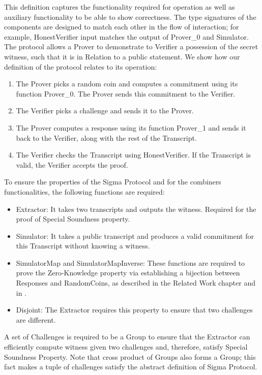 This definition captures the functionality required for operation as well as auxiliary functionality to be able to show correctness. 
The type signatures of the components are designed to match each other in the flow of interaction; for example, HonestVerifier input matches the output of Prover\_0 and Simulator.
The protocol allows a Prover to demonstrate to Verifier a possession of the secret witness, such that it is in Relation to a public statement. 
We show how our definition of the protocol relates to its operation:
\begin{enumerate}
\item The Prover picks a random coin and computes a commitment using its function Prover\_0. The Prover sends this commitment to the Verifier.
\item The Verifier picks a challenge and sends it to the Prover.
\item The Prover computes a response using its function Prover\_1 and sends it back to the Verifier, along with the rest of the Transcript.
\item The Verifier checks the Transcript using HonestVerifier. If the Transcript is valid, the Verifier accepts the proof.
\end{enumerate}
To ensure the properties of the Sigma Protocol and for the combiners functionalities, the following functions are required:
\begin{itemize}
\item Extractor: It takes two transcripts and outputs the witness. Required for the proof of Special Soundness property.
\item Simulator: It takes a public transcript and produces a valid commitment for this Transcript without knowing a witness.
\item SimulatorMap and SimulatorMapInverse: These functions are required to prove the Zero-Knowledge property via establishing a 
bijection between Responses and RandomCoins, as described in the Related Work chapter and in \cite{Haines2019VerifiedVF}.
\item Disjoint: The Extractor requires this property to ensure that two challenges are different.
\end{itemize}
A set of Challenges is required to be a Group to ensure that the Extractor can efficiently compute witness given two challenges and, 
therefore, satisfy Special Soundness Property. Note that cross product of Groups also forms a Group; this fact makes a tuple of 
challenges satisfy the abstract definition of Sigma Protocol. \\
